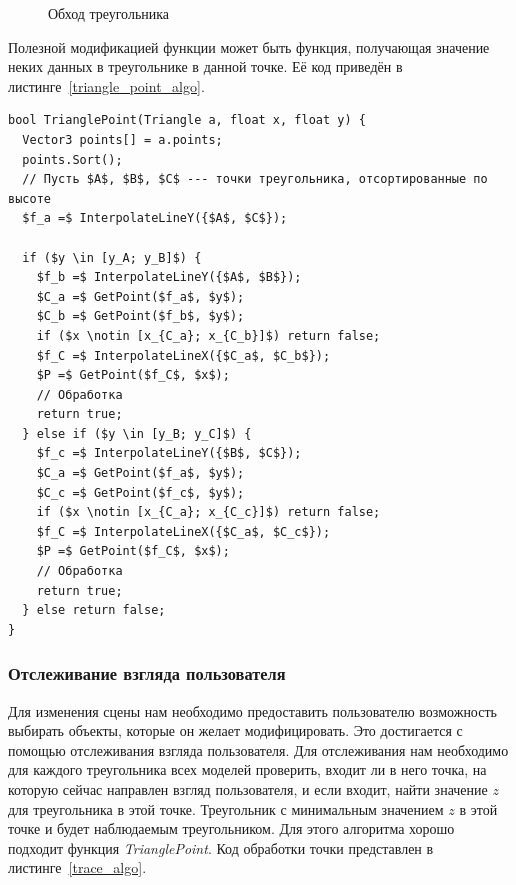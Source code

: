 \documentclass[a4paper,12pt]{report}
\numberwithin{equation}{section}
\begin{document}
\begin{figure}[!h]
\centering
{}
\caption{Обход треугольника}
\label{triangle_traverse_img}
\end{figure}

Полезной модификацией функции может быть функция, получающая значение неких данных в треугольнике в данной точке. Её код приведён в листинге~\ref{triangle_point_algo}.

\begin{lstlisting}[float=p,caption={Нахождение точки треугольника},label=triangle_point_algo]
bool TrianglePoint(Triangle a, float x, float y) {
  Vector3 points[] = a.points;
  points.Sort();
  // Пусть $A$, $B$, $C$ --- точки треугольника, отсортированные по высоте
  $f_a =$ InterpolateLineY({$A$, $C$});
  
  if ($y \in [y_A; y_B]$) {
    $f_b =$ InterpolateLineY({$A$, $B$});
    $C_a =$ GetPoint($f_a$, $y$);
    $C_b =$ GetPoint($f_b$, $y$);
    if ($x \notin [x_{C_a}; x_{C_b}]$) return false;
    $f_C =$ InterpolateLineX({$C_a$, $C_b$});
    $P =$ GetPoint($f_C$, $x$);
    // Обработка
    return true;
  } else if ($y \in [y_B; y_C]$) {
    $f_c =$ InterpolateLineY({$B$, $C$});
    $C_a =$ GetPoint($f_a$, $y$);
    $C_c =$ GetPoint($f_c$, $y$);
    if ($x \notin [x_{C_a}; x_{C_c}]$) return false;
    $f_C =$ InterpolateLineX({$C_a$, $C_c$});
    $P =$ GetPoint($f_C$, $x$);
    // Обработка
    return true;
  } else return false;
}
\end{lstlisting}

\subsubsection{Отслеживание взгляда пользователя}
Для изменения сцены нам необходимо предоставить пользователю возможность выбирать объекты, которые он желает модифицировать. Это достигается с помощью отслеживания взгляда пользователя. Для отслеживания нам необходимо для каждого треугольника всех моделей проверить, входит ли в него точка, на которую сейчас направлен взгляд пользователя, и если входит, найти значение $z$ для треугольника в этой точке. Треугольник с минимальным значением $z$ в этой точке и будет наблюдаемым треугольником. Для этого алгоритма хорошо подходит функция \textit{TrianglePoint}. Код обработки точки представлен в листинге~\ref{trace_algo}.
\end{document}
